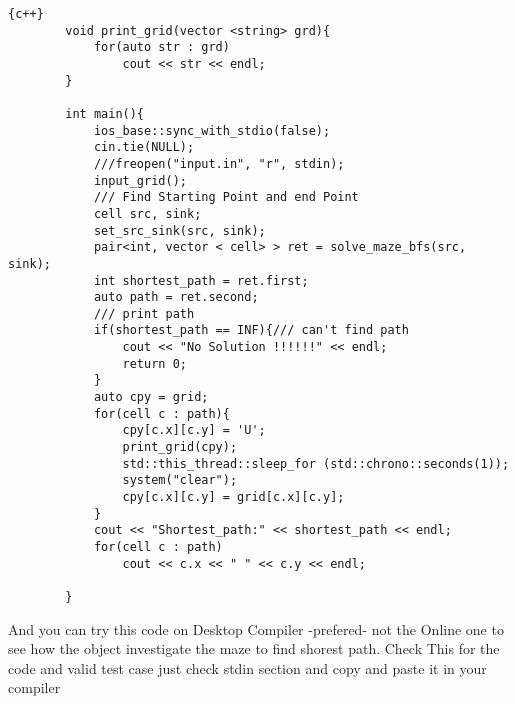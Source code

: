 \begin{lstlisting}{c++}
        void print_grid(vector <string> grd){
        	for(auto str : grd)
        		cout << str << endl;
        }
        
        int main(){
        	ios_base::sync_with_stdio(false);
        	cin.tie(NULL);
        	///freopen("input.in", "r", stdin);
        	input_grid();
        	/// Find Starting Point and end Point
        	cell src, sink;
        	set_src_sink(src, sink);
        	pair<int, vector < cell> > ret = solve_maze_bfs(src, sink);
        	int shortest_path = ret.first;
        	auto path = ret.second;
        	/// print path
        	if(shortest_path == INF){/// can't find path
        		cout << "No Solution !!!!!!" << endl;
        		return 0;
        	}
        	auto cpy = grid;
        	for(cell c : path){	
        		cpy[c.x][c.y] = 'U';
        		print_grid(cpy);
        		std::this_thread::sleep_for (std::chrono::seconds(1));
           		system("clear");
        		cpy[c.x][c.y] = grid[c.x][c.y];
        	}
        	cout << "Shortest_path:" << shortest_path << endl;
        	for(cell c : path)
        		cout << c.x << " " << c.y << endl;
        	
        }
\end{lstlisting}

And you can try this code on Desktop Compiler -prefered- not the Online one to see how the object investigate the maze to find shorest path. Check This \href{https://ideone.com/QPASLt?fbclid=IwAR11HdoKLp3ELsjZK5voKQazZ5bE7dcnNdqi1oc99vqRwYN3DZ1wU-bCdzY}{}  for the code and valid test case just check stdin section and copy and paste it in your compiler  
